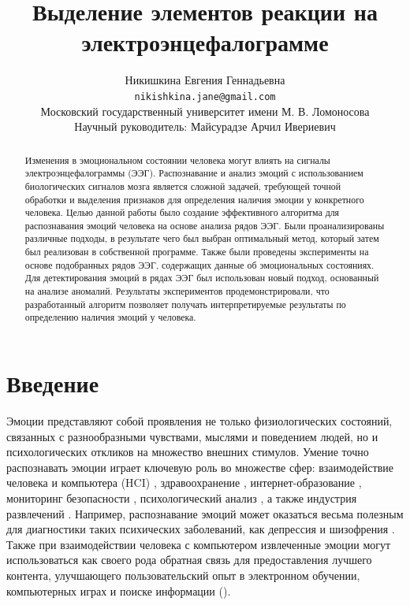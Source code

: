 \documentclass{article}
\title{Выделение элементов реакции на электроэнцефалограмме}
\author{ Никишкина Евгения Геннадьевна \\
        \texttt{nikishkina.jane@gmail.com} \\
	Московский государственный университет имени М. В. Ломоносова\\
    Научный руководитель: Майсурадзе Арчил Ивериевич \\
	} \\
\date{}
\begin{document}
\maketitle

\begin{abstract}
	Изменения в эмоциональном состоянии человека могут влиять на сигналы электроэнцефалограммы (ЭЭГ). Распознавание и анализ эмоций с использованием биологических сигналов мозга является сложной задачей, требующей точной обработки и выделения признаков для определения наличия эмоции у конкретного человека. Целью данной работы было создание эффективного алгоритма для распознавания эмоций человека на основе анализа рядов ЭЭГ. Были проанализированы различные подходы, в результате чего был выбран оптимальный метод, который затем был реализован в собственной программе. Также были проведены эксперименты на основе подобранных рядов ЭЭГ, содержащих данные об эмоциональных состояниях. Для детектирования эмоций в рядах ЭЭГ был использован новый подход, основанный на анализе аномалий. Результаты экспериментов продемонстрировали, что разработанный алгоритм позволяет получать интерпретируемые результаты по определению наличия эмоций у человека.
\end{abstract}



\section{Введение}
Эмоции представляют собой проявления не только физиологических состояний, связанных с разнообразными чувствами, мыслями и поведением людей, но и психологических откликов на множество внешних стимулов. Умение точно распознавать эмоции играет ключевую роль во множестве сфер: взаимодействие человека и компьютера (HCI) \citep{HCI}, здравоохранение \citep{healtcare}, интернет-образование \citep{inted}, мониторинг безопасности \citep{security}, психологический анализ \citep{psych}, а также индустрия развлечений \citep{entern}. Например, распознавание эмоций может оказаться весьма полезным для диагностики таких психических заболеваний, как депрессия и шизофрения \citep{schizophrenia}. Также при взаимодействии человека с компьютером извлеченные эмоции могут использоваться как своего рода обратная связь для предоставления лучшего контента, улучшающего пользовательский опыт в электронном обучении, компьютерных играх и поиске информации (\citep{HCI}).
\end{document}
